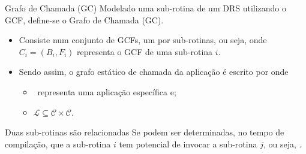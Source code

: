    \begin{frame}{Grafo de Chamada (GC)}
      Modelado uma sub-rotina de um DRS utilizando o GCF, define-se o Grafo de Chamada (GC).
      
      \begin{itemize}
         \setlength{\itemsep}{0.6em}
         \item Consiste num conjunto de GCFs, um por sub-rotinas, ou seja, 
         onde $ C_i = (B_i, F_i) $ representa o GCF de uma sub-rotina $ i $. 
         
         \item Sendo assim, o grafo estático de chamada da aplicação é escrito por  onde 
         \begin{itemize}
            \item \A\ representa uma aplicação específica e;
            \item $ \mathcal{L} \subseteq \mathcal{C} \times \mathcal{C} $. 
         \end{itemize}
         
      \end{itemize}
   
      \begin{block}{Duas sub-rotinas são relacionadas}
         Se podem ser determinadas, no tempo de compilação, que a sub-rotina $ i $ tem potencial de invocar a sub-rotina $ j $, ou seja, .
      \end{block}
   \end{frame}
   
